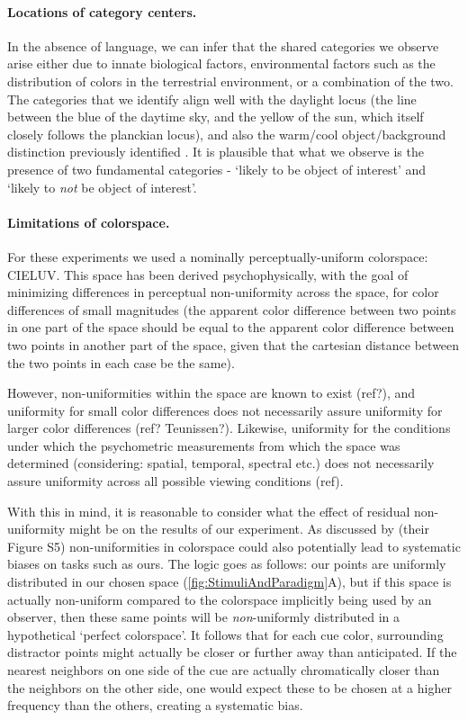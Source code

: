 
\paragraph{Locations of category centers.}

In the absence of language, we can infer that the shared categories we observe arise either due to innate biological factors, environmental factors such as the distribution of colors in the terrestrial environment, or a combination of the two.
The categories that we identify align well with the daylight locus (the line between the blue of the daytime sky, and the yellow of the sun, which itself closely follows the planckian locus), and also the warm/cool object/background distinction previously identified \citep{rosenthal_color_2018}. It is plausible that what we observe is the presence of two fundamental categories - `likely to be object of interest' and `likely to \emph{not} be object of interest'. 

\paragraph{Limitations of colorspace.}

For these experiments we used a nominally perceptually-uniform colorspace: CIELUV. This space has been derived psychophysically, with the goal of minimizing differences in perceptual non-uniformity across the space, for color differences of small magnitudes (the apparent color difference between two points in one part of the space should be equal to the apparent color difference between two points in another part of the space, given that the cartesian distance between the two points in each case be the same).

However, non-uniformities within the space are known to exist (ref?), and uniformity for small color differences does not necessarily assure uniformity for larger color differences (ref? Teunissen?). Likewise, uniformity for the conditions under which the psychometric measurements from which the space was determined (considering: spatial, temporal, spectral etc.) does not necessarily assure uniformity across all possible viewing conditions (ref).

With this in mind, it is reasonable to consider what the effect of residual non-uniformity might be on the results of our experiment. As discussed by \cite{panichello_error-correcting_2019} (their Figure S5) non-uniformities in colorspace could also potentially lead to systematic biases on tasks such as ours. The logic goes as follows: our points are uniformly distributed in our chosen space (\autoref{fig:StimuliAndParadigm}A), but if this space is actually non-uniform compared to the colorspace implicitly being used by an observer, then these same points will be \emph{non}-uniformly distributed in a hypothetical `perfect colorspace'. It follows that for each cue color, surrounding distractor points might actually be closer or further away than anticipated. If the nearest neighbors on one side of the cue are actually chromatically closer than the neighbors on the other side, one would expect these to be chosen at a higher frequency than the others, creating a systematic bias.

